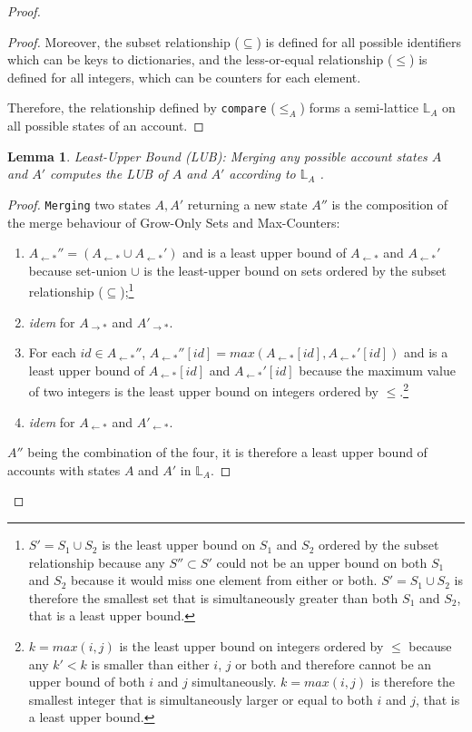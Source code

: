 \documentclass[9pt, oneside]{article}   	%
\newtheorem{lemma}{Lemma}
\begin{document}
\begin{proof}
\begin{proof}
Moreover, the subset relationship ($\subseteq$) is defined for all possible identifiers which can be keys to dictionaries, and the less-or-equal relationship ($\leq$) is defined for all integers, which can be counters for each element. 

Therefore, the relationship defined by \texttt{compare} ($\leq_A$) forms a semi-lattice $\mathds{L}_A$ on all possible states of an account.
\end{proof}

\begin{lemma}
Least-Upper Bound (LUB): Merging any possible account states $A$ and $A'$ computes the LUB of $A$ and $A'$ according to $\mathds{L}_A$ .
\end{lemma}

\begin{proof}
\texttt{Merging} two states $A, A'$ returning a new state $A''$ is the composition of the merge behaviour of Grow-Only Sets and Max-Counters: 
\begin{enumerate}
  \item $A_{\leftarrow *}''= (A_{\leftarrow *} \cup A_{\leftarrow *}')$ and is a least upper bound of $A_{\leftarrow *}$ and $A_{\leftarrow *}'$ because set-union $\cup$ is the least-upper bound on sets ordered by the subset relationship ($\subseteq$);\footnote{$S'=S_1 \cup S_2$ is the least upper bound on $S_1$ and $S_2$ ordered by the subset relationship because any $S'' \subset S'$ could not be an upper bound on both $S_1$ and $S_2$ because it would miss one element from either or both. $S'=S_1 \cup S_2$ is therefore the smallest set that is simultaneously greater than both $S_1$ and $S_2$, that is a least upper bound.}
  \item \textit{idem} for $A_{\rightarrow *}$ and $A'_{\rightarrow *}$.
  \item For each $id \in A_{\leftarrow *}''$, $A_{\leftarrow *}''[id]=\textit{max}(A_{\leftarrow *}[id], A_{\leftarrow *}'[id])$ and is a least upper bound of $A_{\leftarrow *}[id]$ and  $A_{\leftarrow *}'[id]$ because the maximum value of two integers is the least upper bound on integers ordered by $\leq$.\footnote{$k=\textit{max}(i,j)$ is the least upper bound on integers ordered by $\leq$ because any $k' < k$ is smaller than either $i$, $j$ or both and therefore cannot be an upper bound of both $i$ and $j$ simultaneously. $k=\textit{max}(i,j)$ is therefore the smallest integer that is simultaneously larger or equal to both $i$ and $j$, that is a least upper bound.}  
  \item \textit{idem} for $A_{\leftarrow *}$ and $A'_{\leftarrow *}$.
 \end{enumerate} 
  $A''$ being the combination of the four, it is therefore a least upper bound of accounts with states $A$ and $A'$ in $\mathds{L}_A$. 


\end{proof}
\end{proof}
\end{document}
